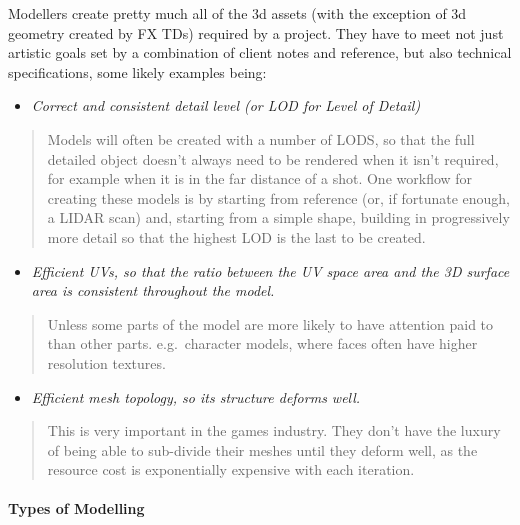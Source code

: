 Modellers create pretty much all of the 3d assets (with the exception of 3d geometry created by FX TDs) required by a project. They have to meet not just artistic goals set by a combination of client notes and reference, but also technical specifications, some likely examples being:

\begin{itemize}
\tightlist
\item
  \emph{Correct and consistent detail level (or LOD for Level of Detail)}
\end{itemize}

\begin{quote}
Models will often be created with a number of LODS, so that the full detailed object doesn't always need to be rendered when it isn't required, for example when it is in the far distance of a shot. One workflow for creating these models is by starting from reference (or, if fortunate enough, a LIDAR scan) and, starting from a simple shape, building in progressively more detail so that the highest LOD is the last to be created.
\end{quote}

\begin{itemize}
\tightlist
\item
  \emph{Efficient UVs, so that the ratio between the UV space area and the 3D surface area is consistent throughout the model.}
\end{itemize}

\begin{quote}
Unless some parts of the model are more likely to have attention paid to than other parts. e.g.~character models, where faces often have higher resolution textures.
\end{quote}

\begin{itemize}
\tightlist
\item
  \emph{Efficient mesh topology, so its structure deforms well.}
\end{itemize}

\begin{quote}
This is very important in the games industry. They don't have the luxury of being able to sub-divide their meshes until they deform well, as the resource cost is exponentially expensive with each iteration.
\end{quote}

\hypertarget{types-of-modelling}{%
\paragraph{Types of Modelling}\label{types-of-modelling}}

